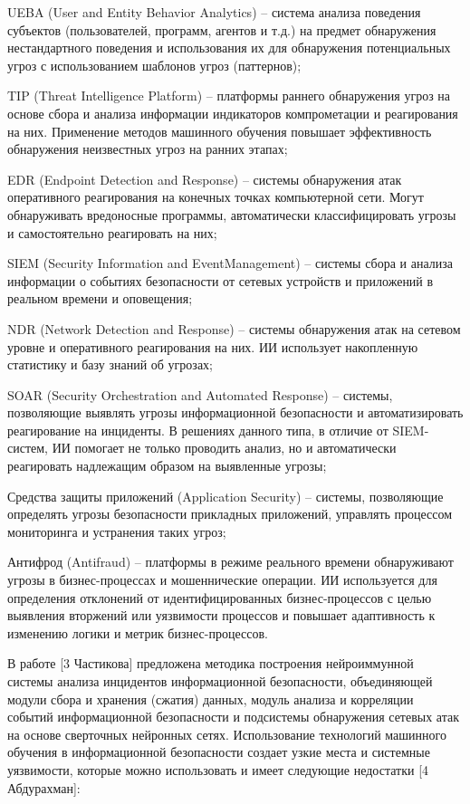 \begin{textitemize}
	\item UEBA (User and Entity Behavior Analytics) -- система анализа поведения субъектов (пользователей, программ, агентов и т.д.) на предмет обнаружения нестандартного поведения и использования их для обнаружения потенциальных угроз с использованием шаблонов угроз (паттернов);
	\item TIP (Threat Intelligence Platform) -- платформы раннего обнаружения угроз на основе сбора и анализа информации индикаторов компрометации и реагирования на них. Применение методов машинного обучения повышает эффективность обнаружения неизвестных угроз на ранних этапах;
	\item EDR (Endpoint Detection and Response) -- системы обнаружения атак оперативного реагирования на конечных точках компьютерной сети. Могут обнаруживать вредоносные программы, автоматически классифицировать угрозы и самостоятельно реагировать на них;
	\item SIEM (Security Information and EventManagement) -- системы сбора и анализа информации о событиях безопасности от сетевых устройств и приложений в реальном времени и оповещения;
	\item NDR (Network Detection and Response) -- системы обнаружения атак на сетевом уровне и оперативного реагирования на них. ИИ использует накопленную статистику и базу знаний об угрозах;
	\item SOAR (Security Orchestration and Automated Response) -- системы, позволяющие выявлять угрозы информационной безопасности и автоматизировать реагирование на инциденты. В решениях данного типа, в отличие от SIEM-систем, ИИ помогает не только проводить анализ, но и автоматически реагировать надлежащим образом на выявленные угрозы;
	\item Средства защиты приложений (Application Security) -- системы, позволяющие определять угрозы безопасности прикладных приложений, управлять процессом мониторинга и устранения таких угроз;
	\item Антифрод (Antifraud) -- платформы в режиме реального времени обнаруживают угрозы в бизнес-процессах и мошеннические операции. ИИ используется для определения отклонений от идентифицированных бизнес-процессов с целью выявления вторжений или уязвимости процессов и повышает адаптивность к изменению логики и метрик бизнес-процессов.
\end{textitemize}


В работе [3 Частикова] предложена методика построения нейроиммунной системы анализа инцидентов информационной безопасности, объединяющей модули сбора и хранения (сжатия) данных, модуль анализа и корреляции событий информационной безопасности и подсистемы обнаружения сетевых атак на основе сверточных нейронных сетях. Использование технологий машинного обучения в информационной безопасности создает узкие места и системные уязвимости, которые можно использовать и имеет следующие недостатки [4 Абдурахман]:


